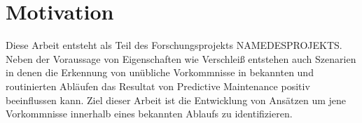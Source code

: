 \section{Motivation}
Diese Arbeit entsteht als Teil des Forschungsprojekts NAMEDESPROJEKTS. Neben der Voraussage von Eigenschaften wie Verschleiß entstehen auch Szenarien in denen die Erkennung von unübliche Vorkommnisse in bekannten und routinierten Abläufen das Resultat von Predictive Maintenance positiv beeinflussen kann. Ziel dieser Arbeit ist die Entwicklung von Ansätzen um jene Vorkommnisse innerhalb eines bekannten Ablaufs zu identifizieren.